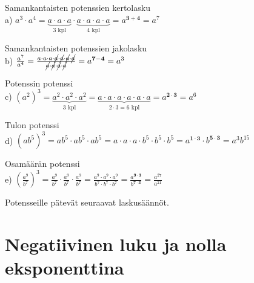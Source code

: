     Samankantaisten potenssien kertolasku\\
    a) $a^3\cdot a^4=\underbrace{a\cdot a\cdot a}_{\text{$3$ kpl}}\cdot \underbrace{a\cdot a\cdot a\cdot a}_{\text{$4$ kpl}}=a^{\mathbf{3+4}}=a^7$
    
    Samankantaisten potenssien jakolasku\\
    b) $\frac{a^7}{a^4}=\frac{a\cdot a\cdot a\cdot \cancel{a}\cdot \cancel{a}\cdot \cancel{a}\cdot \cancel{a}}{\cancel{a}\cdot \cancel{a}\cdot \cancel{a}\cdot \cancel{a}}=a^{\mathbf{7-4}}=a^3$
    
    Potenssin potenssi\\
    c) $(a^2)^3=\underbrace{a^2\cdot a^2\cdot a^2}_{3\text{ kpl}}=\underbrace{a\cdot a\cdot a\cdot a\cdot a\cdot a}_{\text{$2\cdot 3=6$  kpl}}=a^{\mathbf{2\cdot 3}}=a^6$
    
    Tulon potenssi\\
    d) $(ab^5)^3=ab^5\cdot ab^5\cdot ab^5=a\cdot a\cdot a\cdot b^5\cdot b^5\cdot b^5=a^{\mathbf{1\cdot 3}}\cdot b^{\mathbf{5\cdot 3}}=a^3b^{15}$
    
    Osamäärän potenssi\\
    e) $\left(\frac{a^9}{b^7}\right)^3=\frac{a^9}{b^7}\cdot \frac{a^9}{b^7}\cdot \frac{a^9}{b^7}=\frac{a^9\cdot a^9\cdot a^9}{b^7\cdot b^7\cdot b^7}=\frac{a^{\mathbf{9\cdot 3}}}{b^{\mathbf{7\cdot 3}}}=\frac{a^{27}}{a^{21}}$

    Potensseille pätevät seuraavat laskusäännöt.
    
    
\section*{Negatiivinen luku ja nolla eksponenttina}
    
